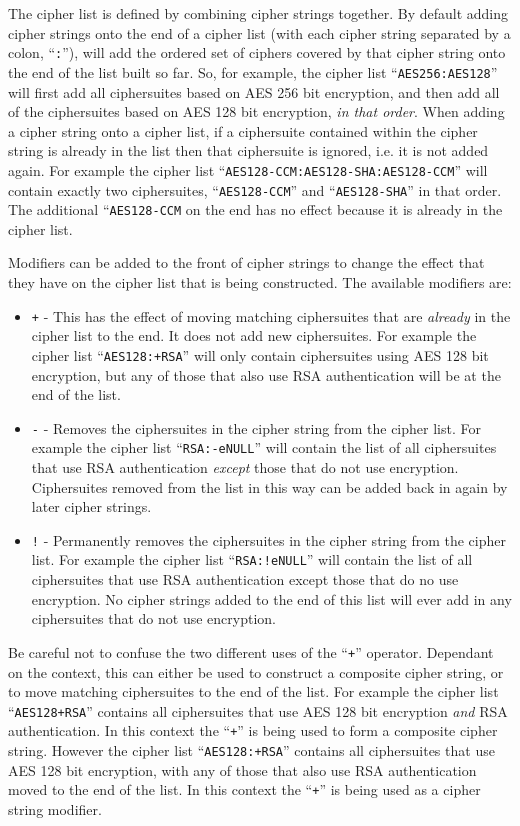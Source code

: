 The cipher list is defined by combining cipher strings together. By default
adding cipher strings onto the end of a cipher list (with each cipher string
separated by a colon, ``\verb!:!''), will add the ordered set of ciphers
covered by that cipher string onto the end of the list built so far. So, for
example, the cipher list ``\verb!AES256:AES128!'' will first add all
ciphersuites based on AES 256 bit encryption, and then add all of the
ciphersuites based on AES 128 bit encryption, \emph{in that order}. When adding
a cipher string onto a cipher list, if a ciphersuite contained within the
cipher string is already in the list then that ciphersuite is ignored, i.e. it
is not added again. For example the cipher list
``\verb!AES128-CCM:AES128-SHA:AES128-CCM!'' will contain exactly two
ciphersuites, ``\verb!AES128-CCM!'' and ``\verb!AES128-SHA!'' in that order. The
additional ``\verb!AES128-CCM! on the end has no effect because it is already in
the cipher list.

Modifiers can be added to the front of cipher strings to change the effect that
they have on the cipher list that is being constructed. The available modifiers
are:
\begin{itemize}
\item \texttt{+} - This has the effect of moving matching ciphersuites that are
\emph{already} in the cipher list to the end. It does not add new ciphersuites.
For example the cipher list ``\texttt{AES128:+RSA}'' will only contain
ciphersuites using AES 128 bit encryption, but any of those that also use RSA
authentication will be at the end of the list.
\item \texttt{-} - Removes the ciphersuites in the cipher string from the
cipher list. For example the cipher list ``\texttt{RSA:-eNULL}'' will contain
the list of all ciphersuites that use RSA authentication \emph{except} those
that do not use encryption. Ciphersuites removed from the list in this way can
be added back in again by later cipher strings.
\item \texttt{!} - Permanently removes the ciphersuites in the cipher string
from the cipher list. For example the cipher list ``\texttt{RSA:!eNULL}'' will
contain the list of all ciphersuites that use RSA authentication except those
that do no use encryption. No cipher strings added to the end of this list will
ever add in any ciphersuites that do not use encryption.
\end{itemize}

Be careful not to confuse the two different uses of the ``\verb!+!'' operator.
Dependant on the context, this can either be used to construct a composite
cipher string, or to move matching ciphersuites to the end of the list. For
example the cipher list ``\verb!AES128+RSA!'' contains all ciphersuites that use
AES 128 bit encryption \emph{and} RSA authentication. In this context the
``\verb!+!'' is being used to form a composite cipher string. However the cipher
list ``\verb!AES128:+RSA!'' contains all ciphersuites that use AES 128 bit
encryption, with any of those that also use RSA authentication moved to the end
of the list. In this context the ``\verb!+!'' is being used as a cipher string
modifier.

